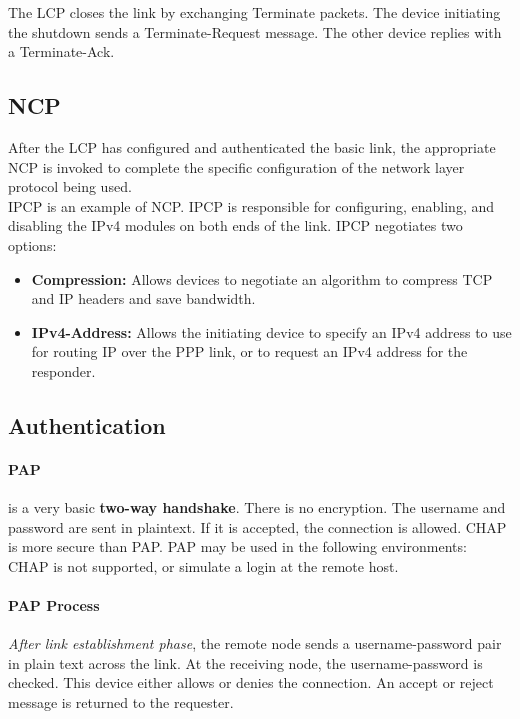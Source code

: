 The LCP closes the link by exchanging Terminate packets. The device initiating the shutdown sends a Terminate-Request message. The other device replies with a Terminate-Ack. 

\subsection{NCP}

After the LCP has configured and authenticated the basic link, the appropriate NCP is invoked to complete the specific configuration of the network layer protocol being used.\\

IPCP is an example of NCP. IPCP is responsible for configuring, enabling, and disabling the IPv4 modules on both ends of the link. IPCP negotiates two options:

\begin{itemize}
\item \textbf{Compression:} Allows devices to negotiate an algorithm to compress TCP and IP headers and save bandwidth.

\item \textbf{IPv4-Address:} Allows the initiating device to specify an IPv4 address to use for routing IP over the PPP link, or to request an IPv4 address for the responder.
\end{itemize}

\subsection{Authentication}

\paragraph{PAP}is a very basic \textbf{two-way handshake}. There is no encryption. The username and password are sent in plaintext. If it is accepted, the connection is allowed. CHAP is more secure than PAP. PAP may be used in the following environments: CHAP is not supported, or simulate a login at the remote host. 

\paragraph{PAP Process}\emph{After link establishment phase}, the remote node sends a username-password pair in plain text across the link. At the receiving node, the username-password is checked. This device either allows or denies the connection. An accept or reject message is returned to the requester.

